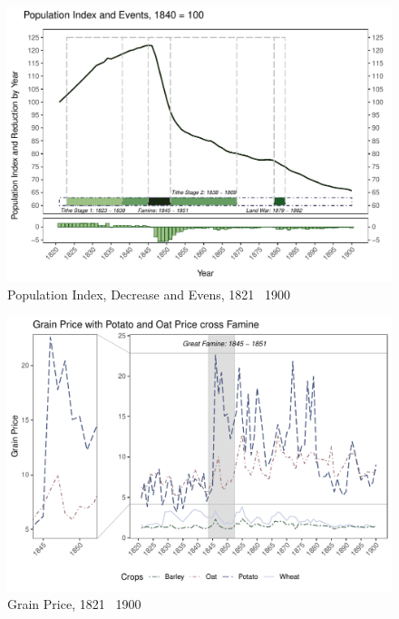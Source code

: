 \begin{figure}[htbp]
    \centering
    \caption{Population Index, Decrease and Evens, 1821 \textendash\ 1900}
    \includegraphics[width=\textwidth]{../03_outputs/popline.pdf}
\end{figure}

\begin{figure}[htbp]
    \centering
    \caption{Grain Price, 1821 \textendash\ 1900}
    \includegraphics[width=\textwidth]{../03_outputs/grain_price.pdf}
\end{figure}




